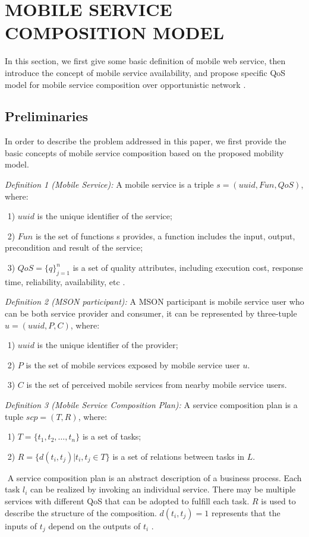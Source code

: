 \documentclass[10pt,journal,compsoc]{IEEEtran}
\begin{document}
\section{MOBILE SERVICE COMPOSITION MODEL}
In this section, we first give some basic definition of mobile web service, then introduce the concept of mobile service availability, and propose specific QoS model for mobile service composition over opportunistic network \cite{Deng2016-2}.
\subsection{Preliminaries}
In order to describe the problem addressed in this paper, we first provide the basic concepts of mobile service composition based on the proposed mobility model.

\textit{Definition 1 (Mobile Service):} A mobile service is a triple $s = (uuid, Fun, QoS)$, where:

​	1) $uuid$ is the unique identifier of the service;

​	2) $Fun$ is the set of functions s provides, a function includes the input, output, precondition and result of the service;

​	3) $QoS = \{q\}^n_{j=1}$ is a set of quality attributes, including execution cost, response time, reliability, availability, etc \cite{Deng2016-2}.

\textit{Definition 2 (MSON participant):} A MSON participant is mobile service user who can be both service provider and consumer, it can be represented by three-tuple $u = (uuid, P, C)$, where:

​	1) $uuid$ is the unique identifier of the provider;

​	2) $P$ is the set of mobile services exposed by mobile service user $u$.

​	3) $C$ is the set of perceived mobile services from nearby mobile service users.

\textit{Definition 3 (Mobile Service Composition Plan):} A service composition plan is a tuple $scp = (T, R)$, where:

​	1) $T = \{t_1,t_2,…,t_n\}$ is a set of tasks;

​	2) $R = \{d(t_i,t_j)|t_i,t_j \in T\}$ is a set of relations between tasks in $L$.

​	A service composition plan is an abstract description of a business process. Each task $l_i$ can be realized by invoking an individual service. There may be multiple services with different QoS that can be adopted to fulfill each task. $R$ is used to describe the structure of the composition. $d(t_i, t_j) = 1$ represents that the inputs of $t_j$ depend on the outputs of $t_i$ \cite{Deng2016-2}.
\end{document}
